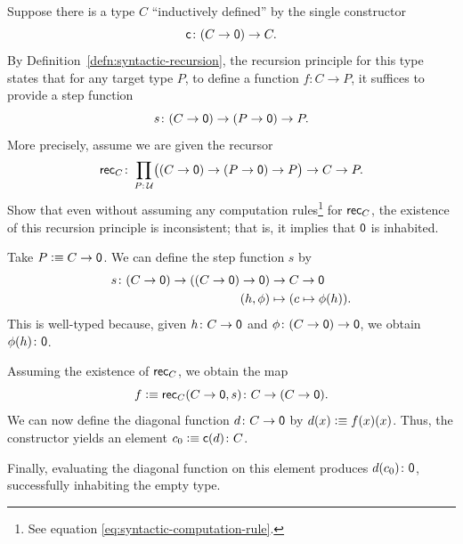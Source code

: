 \begin{exr}
    Suppose there is a type\/ $C$ ``inductively defined'' by the single constructor
    \[
        \fun c\colon(C\to\fun0)\to C.
    \]
    By\/ {\upshape Definition~\ref{defn:syntactic-recursion}}, the recursion principle for this type states that for any target type\/ $P$, to define a function\/ $f\colon C\to P$, it suffices to provide a step function
    \[
        s\colon(C\to\fun0)\to(P\to\fun0)\to P.
    \]
    More precisely, assume we are given the recursor
    \[
        \fun{rec}_C\colon
            \prod_{P\colon\univ}
                \bigl(
                    (C\to\fun0)\to(P\to\fun0)\to P
                \bigr)
                \to C\to P.
    \]
    Show that even without assuming any computation rules\footnote{See equation \eqref{eq:syntactic-computation-rule}.} for\/ $\mathsf{rec}_C$, the existence of this recursion principle is inconsistent; that is, it implies that\/ $\mathsf{0}$ is inhabited.
\end{exr}

\begin{solution}
    Take $P\mathrel{\vcentcolon}\equiv C\to\mathsf{0}$. We can define the step function $s$ by
    \begin{align*}
        s\colon(C\to\fun0)\to((C\to\fun0)\to\fun0)
            &\to C\to\fun0\\
        (h,\phi)&\mapsto(c\mapsto\phi(h)).
    \end{align*}
    This is well-typed because, given $h\colon C\to\fun0$ and $\phi\colon(C\to\fun0)\to\fun0$, we obtain $\phi(h)\colon\fun0$.

    Assuming the existence of $\mathsf{rec}_C$, we obtain the map
    \[
     f\defeq\fun{rec}_C(C\to\fun0,s)
     \colon C\to(C\to\fun0).
    \]
    We can now define the diagonal function $d\colon C\to\fun0$ by $d(x)\mathrel{\vcentcolon}\equiv f(x)(x)$. Thus, the constructor yields an element $c_0\defeq\fun c(d)\colon C$. 
    
    Finally, evaluating the diagonal function on this element produces $d(c_0)\colon\fun0$, successfully inhabiting the empty type.
    
\end{solution}

